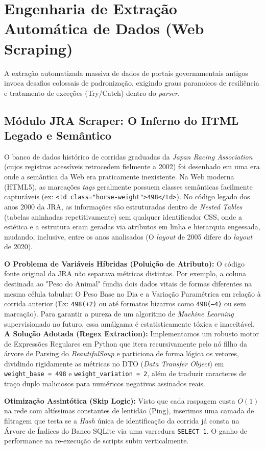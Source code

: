 \documentclass[12pt,a4paper]{article}
\begin{document}
\section{Engenharia de Extração Automática de Dados (Web Scraping)}
A extração automatizada massiva de dados de portais governamentais antigos invoca desafios colossais de padronização, exigindo graus paranoicos de resiliência e tratamento de exceções (Try/Catch) dentro do \textit{parser}.

\subsection{Módulo JRA Scraper: O Inferno do HTML Legado e Semântico}
O banco de dados histórico de corridas graduadas da \textit{Japan Racing Association} (cujos registros acessíveis retrocedem fielmente a 2002) foi desenhado em uma era onde a semântica da Web era praticamente inexistente. Na Web moderna (HTML5), as marcações \textit{tags} geralmente possuem classes semânticas facilmente capturáveis (ex: \texttt{<td class="horse-weight">498</td>}).
No código legado dos anos 2000 da JRA, as informações são estruturadas dentro de \textit{Nested Tables} (tabelas aninhadas repetitivamente) sem qualquer identificador CSS, onde a estética e a estrutura eram geradas via atributos em linha e hierarquia engessada, mudando, inclusive, entre os anos analisados (O \textit{layout} de 2005 difere do \textit{layout} de 2020).

\textbf{O Problema de Variáveis Híbridas (Poluição de Atributo):} O código fonte original da JRA não separava métricas distintas. Por exemplo, a coluna destinada ao "Peso do Animal" fundia dois dados vitais de formas diferentes na mesma célula tabular: O Peso Base no Dia e a Variação Paramétrica em relação à corrida anterior (Ex: \texttt{498(+2)} ou até formatos bizarros como \texttt{498(--4)} ou sem marcação).
Para garantir a pureza de um algoritmo de \textit{Machine Learning} supervisionado no futuro, essa amálgama é estatisticamente tóxica e inaceitável.
\textbf{A Solução Adotada (Regex Extraction):} Implementamos um robusto motor de Expressões Regulares em Python que itera recursivamente pelo nó filho da árvore de Parsing do \textit{BeautifulSoup} e particiona de forma lógica os vetores, dividindo rigidamente as métricas no DTO (\textit{Data Transfer Object}) em \texttt{weight\_base = 498} e \texttt{weight\_variation = 2}, além de traduzir caracteres de traço duplo maliciosos para numéricos negativos assinados reais.

\textbf{Otimização Assintótica (Skip Logic):} Visto que cada raspagem custa $O(1)$ na rede com altíssimas constantes de lentidão (Ping), inserimos uma camada de filtragem que testa se a \textit{Hash} única de identificação da corrida já consta na Árvore de Índices do Banco SQLite via uma varredura \texttt{SELECT 1}. O ganho de performance na re-execução de scripts subiu verticalmente.
\end{document}

